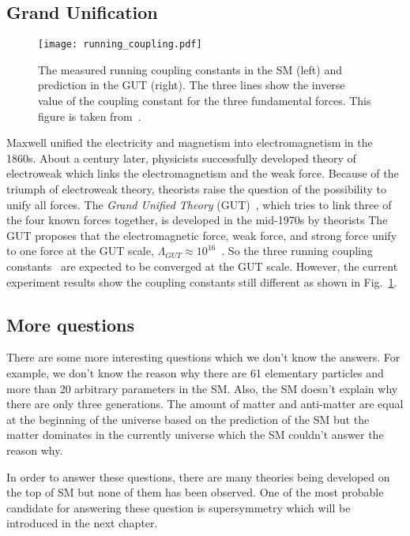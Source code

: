 
\subsection{Grand Unification}
\label{subsec:sm_grand_unification}

\begin{figure}[tbp]
    \begin{center}
        \texttt{[image: running\_coupling.pdf]}
        \caption{The measured running coupling constants in the SM (left) and prediction in the GUT (right).
        The three lines show the inverse value of the coupling constant for the three fundamental forces.
        This figure is taken from~\cite{Ur0ol}.}
        \label{fig:sm_coulping_constants}
    \end{center}
\end{figure}

Maxwell unified the electricity and magnetism into electromagnetism in the 1860s.
About a century later, physicists successfully developed theory of electroweak which links the electromagnetism and the weak force.
Because of the triumph of electroweak theory, theorists raise the question of the possibility to unify all forces.
The \textit{Grand Unified Theory} (GUT)~\cite{Ross:1985ai}, which tries to link three of the four known forces together, is developed in the mid-1970s by theorists
The GUT proposes that the electromagnetic force, weak force, and strong force unify to one force at the GUT scale, $\Lambda_{GUT} \approx 10^{16}$~{\GeV}.
So the three running coupling constants~\cite{Mohr:2015ccw} are expected to be converged at the GUT scale.
However, the current experiment results show the coupling constants still different as shown in Fig.~\ref{fig:sm_coulping_constants}.


\subsection{More questions}
\label{subsec:sm_more_questions}
There are some more interesting questions which we don't know the answers.
For example, we don't know the reason why there are 61 elementary particles and more than 20 arbitrary parameters in the SM.
Also, the SM doesn't explain why there are only three generations.
The amount of matter and anti-matter are equal at the beginning of the universe based on the prediction of the SM but the matter dominates in the currently universe which the SM couldn't answer the reason why.

In order to answer these questions, there are many theories being developed on the top of SM but none of them has been observed.
One of the most probable candidate for answering these question is supersymmetry which will be introduced in the next chapter.
